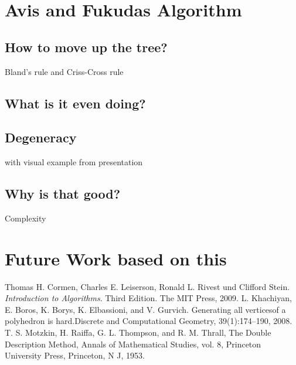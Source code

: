 \documentclass[a4paper, 11pt]{article}
\begin{document}
\section{Avis and Fukudas Algorithm}
\subsection{How to move up the tree?}
Bland's rule and Criss-Cross rule
\subsection{What is it even doing?}
\subsection{Degeneracy}
with visual example from presentation
\subsection{Why is that good?}
Complexity

\section{Future Work based on this }

\newpage

\begin{thebibliography}{9}
	Thomas H. Cormen, Charles E. Leiserson, Ronald L. Rivest und Clifford Stein.
	\textit{Introduction to Algorithms}. Third Edition. The MIT Press, 2009.
	L. Khachiyan, E. Boros, K. Borys, K. Elbassioni, and V. Gurvich. Generating all
	verticesof a polyhedron is hard.Discrete and Computational Geometry,
	39(1):174–190, 2008.
	T. S. Motzkin, H. Raiffa, G. L. Thompson, and R. M. Thrall, The Double Description Method,
	Annals of Mathematical Studies, vol. 8, Princeton University Press, Princeton, N J, 1953.
\end{thebibliography}
\end{document}

